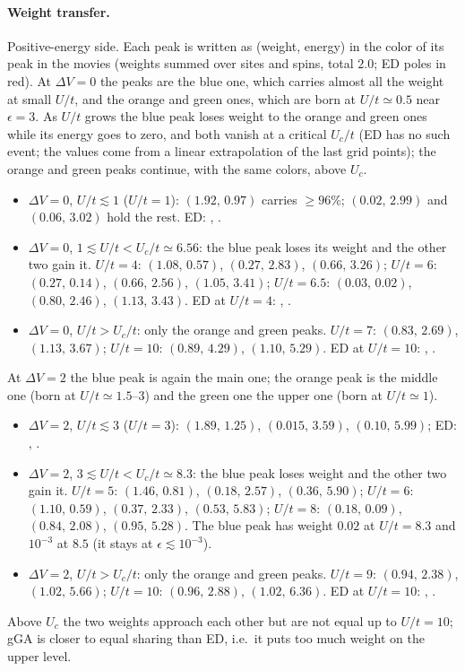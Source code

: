 \documentclass[11pt]{article}
\newcommand{\dV}{\Delta V}
\newcommand{\pkA}[2]{\textcolor{lvA}{$(#1,\,#2)$}}\newcommand{\pkB}[2]{\textcolor{lvB}{$(#1,\,#2)$}}
\newcommand{\pkC}[2]{\textcolor{lvC}{$(#1,\,#2)$}}\newcommand{\pkD}[2]{\textcolor{lvD}{$(#1,\,#2)$}}
\begin{document}
\paragraph{Weight transfer.} Positive-energy side. Each peak is written as (weight, energy) in the color of its peak in the movies (weights summed over sites and spins, total $2.0$; ED poles in red).
At $\dV=0$ the peaks are the blue one, which carries almost all the weight at small $U/t$, and the orange and green ones, which are born at $U/t\simeq0.5$ near $\epsilon=3$. As $U/t$ grows the blue peak loses weight to
the orange and green ones while its energy goes to zero, and both vanish at a critical $U_c/t$ (ED has no such event; the values come from a linear extrapolation of the last grid points);
the orange and green peaks continue, with the same colors, above $U_c$.
\begin{itemize}[nosep]
  \item $\dV=0$, $U/t\lesssim1$ ($U/t=1$): \pkA{1.92}{0.97} carries $\ge96\%$; \pkB{0.02}{2.99} and \pkC{0.06}{3.02} hold the rest. ED: , .
  \item $\dV=0$, $1\lesssim U/t<U_c/t\simeq6.56$: the blue peak loses its weight and the other two gain it.
  $U/t=4$: \pkA{1.08}{0.57}, \pkB{0.27}{2.83}, \pkC{0.66}{3.26}; $U/t=6$: \pkA{0.27}{0.14}, \pkB{0.66}{2.56}, \pkC{1.05}{3.41}; $U/t=6.5$: \pkA{0.03}{0.02}, \pkB{0.80}{2.46}, \pkC{1.13}{3.43}.
  ED at $U/t=4$: , .
  \item $\dV=0$, $U/t>U_c/t$: only the orange and green peaks. $U/t=7$: \pkB{0.83}{2.69}, \pkC{1.13}{3.67}; $U/t=10$: \pkB{0.89}{4.29}, \pkC{1.10}{5.29}. ED at $U/t=10$: , .
\end{itemize}
At $\dV=2$ the blue peak is again the main one; the orange peak is the middle one (born at $U/t\simeq1.5$--$3$) and the green one the upper one (born at $U/t\simeq1$).
\begin{itemize}[nosep]
  \item $\dV=2$, $U/t\lesssim3$ ($U/t=3$): \pkA{1.89}{1.25}, \pkB{0.015}{3.59}, \pkC{0.10}{5.99}; ED: , .
  \item $\dV=2$, $3\lesssim U/t<U_c/t\simeq8.3$: the blue peak loses weight and the other two gain it.
  $U/t=5$: \pkA{1.46}{0.81}, \pkB{0.18}{2.57}, \pkC{0.36}{5.90}; $U/t=6$: \pkA{1.10}{0.59}, \pkB{0.37}{2.33}, \pkC{0.53}{5.83}; $U/t=8$: \pkA{0.18}{0.09}, \pkB{0.84}{2.08}, \pkC{0.95}{5.28}.
  The blue peak has weight $0.02$ at $U/t=8.3$ and $10^{-3}$ at $8.5$ (it stays at $\epsilon\lesssim10^{-3}$).
  \item $\dV=2$, $U/t>U_c/t$: only the orange and green peaks. $U/t=9$: \pkB{0.94}{2.38}, \pkC{1.02}{5.66}; $U/t=10$: \pkB{0.96}{2.88}, \pkC{1.02}{6.36}. ED at $U/t=10$: , .
\end{itemize}
Above $U_c$ the two weights approach each other but are not equal up to $U/t=10$; gGA is closer to equal sharing than ED, i.e.\ it puts too much weight on the upper level.
\end{document}
